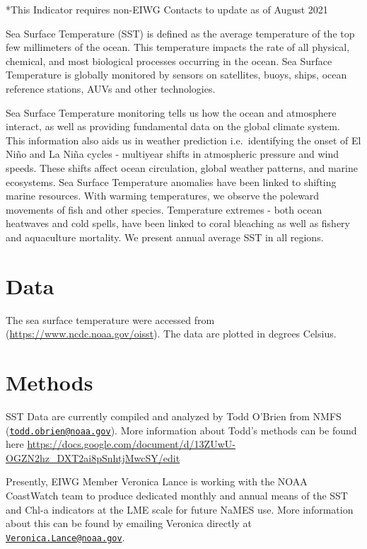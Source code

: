 \documentclass[
]{book}
\begin{document}
*This Indicator requires non-EIWG Contacts to update as of August 2021

Sea Surface Temperature (SST) is defined as the average temperature of the top few millimeters of the ocean. This temperature impacts the rate of all physical, chemical, and most biological processes occurring in the ocean. Sea Surface Temperature is globally monitored by sensors on satellites, buoys, ships, ocean reference stations, AUVs and other technologies.

Sea Surface Temperature monitoring tells us how the ocean and atmosphere interact, as well as providing fundamental data on the global climate system. This information also aids us in weather prediction i.e.~identifying the onset of El Niño and La Niña cycles - multiyear shifts in atmospheric pressure and wind speeds. These shifts affect ocean circulation, global weather patterns, and marine ecosystems. Sea Surface Temperature anomalies have been linked to shifting marine resources. With warming temperatures, we observe the poleward movements of fish and other species. Temperature extremes - both ocean heatwaves and cold spells, have been linked to coral bleaching as well as fishery and aquaculture mortality. We present annual average SST in all regions.

\hypertarget{data-7}{%
\section{Data}\label{data-7}}

The sea surface temperature were accessed from (\url{https://www.ncdc.noaa.gov/oisst}). The data are plotted in degrees Celsius.

\hypertarget{methods-6}{%
\section{Methods}\label{methods-6}}

SST Data are currently compiled and analyzed by Todd O'Brien from NMFS (\href{mailto:todd.obrien@noaa.gov}{\nolinkurl{todd.obrien@noaa.gov}}). More information about Todd's methods can be found here \url{https://docs.google.com/document/d/13ZUwU-OGZN2hz_DXT2ai8pSnhtjMwcSY/edit}

Presently, EIWG Member Veronica Lance is working with the NOAA CoastWatch team to produce dedicated monthly and annual means of the SST and Chl-a indicators at the LME scale for future NaMES use. More information about this can be found by emailing Veronica directly at \href{mailto:Veronica.Lance@noaa.gov}{\nolinkurl{Veronica.Lance@noaa.gov}}.
\end{document}

